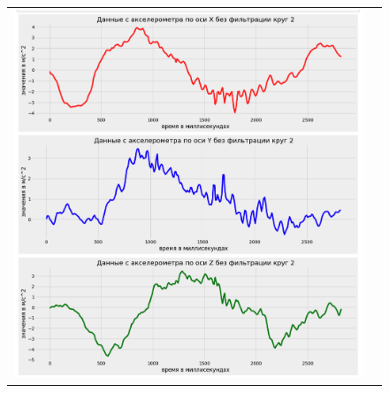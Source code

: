 \newpage
\begin{figure}[H]
    \begin{center}
        \begin{tabular}{cc}
            \includegraphics[width=1\textwidth]{farim/im5.png} & 
        \end{tabular}
    \end{center}
\end{figure}


